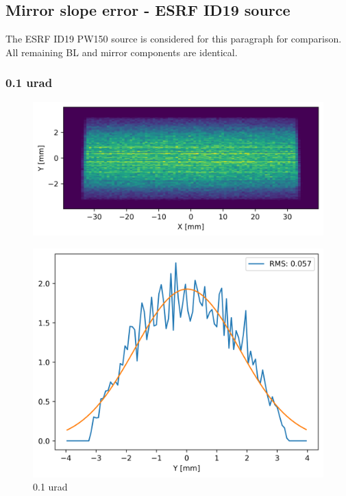 \subsection{Mirror slope error - ESRF ID19 source}
The ESRF ID19 PW150 source is considered for this paragraph for comparison. All remaining BL and mirror components are identical. 

\subsubsection{0.1 urad}
\begin{figure}[H]
\centering
\includegraphics[width=0.85\linewidth]{./../figures/slope_error/WB4C_d30_d-spacing_gradient_45keV_slope_error01urad_ESRFID19PW150.png}
\end{figure}

\begin{figure}[H]
\centering
\includegraphics[width=0.85\linewidth]{./../figures/slope_error/WB4C_d30_d-spacing_gradient_45keV_slope_error01urad_ESRFID19PW150_Yprofile.png}
\caption{0.1 urad}
\label{fig:01urad}
\end{figure}

\clearpage
